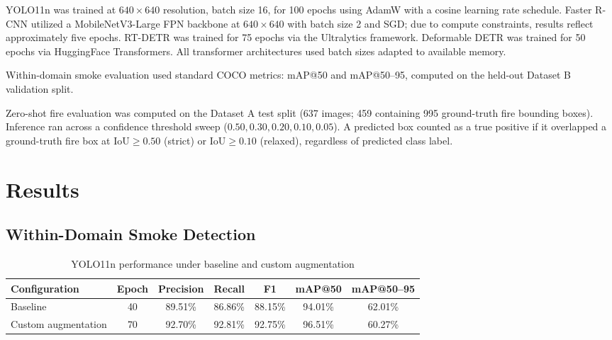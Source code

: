 \documentclass[conference]{IEEEtran}
\begin{document}
YOLO11n was trained at $640\times640$ resolution, batch size 16, for 100 epochs using AdamW with a cosine learning rate schedule. Faster R-CNN utilized a MobileNetV3-Large FPN backbone at $640\times640$ with batch size 2 and SGD; due to compute constraints, results reflect approximately five epochs. RT-DETR was trained for 75 epochs via the Ultralytics framework. Deformable DETR was trained for 50 epochs via HuggingFace Transformers. All transformer architectures used batch sizes adapted to available memory.

Within-domain smoke evaluation used standard COCO metrics: mAP@50 and mAP@50--95, computed on the held-out Dataset B validation split.

Zero-shot fire evaluation was computed on the Dataset A test split (637 images; 459 containing 995 ground-truth fire bounding boxes). Inference ran across a confidence threshold sweep ($0.50, 0.30, 0.20, 0.10, 0.05$). A predicted box counted as a true positive if it overlapped a ground-truth fire box at $\text{IoU} \ge 0.50$ (strict) or $\text{IoU} \ge 0.10$ (relaxed), regardless of predicted class label.

\section{Results}

\subsection{Within-Domain Smoke Detection}

\begin{table}[htbp]
\centering
\caption{YOLO11n performance under baseline and custom augmentation}
\label{tab:yolo11n_augmentation}
\scriptsize
\setlength{\tabcolsep}{3pt}
\begin{tabularx}{\columnwidth}{@{}lcccccc@{}}
\toprule
Configuration & Epoch & Precision & Recall & F1 & mAP@50 & mAP@50--95 \\
\midrule
Baseline            & 40 & 89.51\% & 86.86\% & 88.15\% & 94.01\% & 62.01\% \\
Custom augmentation & 70 & 92.70\% & 92.81\% & 92.75\% & 96.51\% & 60.27\% \\
\bottomrule
\end{tabularx}
\end{table}
\end{document}
